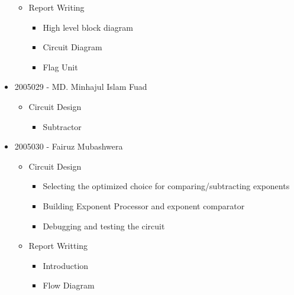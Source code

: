 \documentclass[18pt]{article}
\begin{document}
\begin{itemize}
\begin{itemize}
        \item Report Writing
        \begin{itemize}
            \item High level block diagram
			\item Circuit Diagram
            \item Flag Unit
        \end{itemize}
    \end{itemize}
    \item 2005029 - MD. Minhajul Islam Fuad
    \begin{itemize}
        \item Circuit Design
        \begin{itemize}
            \item Subtractor
        \end{itemize}
    \end{itemize}
    \item 2005030 - Fairuz Mubashwera
    \begin{itemize}
        \item Circuit Design
        \begin{itemize}
        \item Selecting the optimized choice for comparing/subtracting exponents
\item Building Exponent Processor and exponent comparator
\item Debugging and testing the circuit
        \end{itemize}
    \item Report Writting
        \begin{itemize}
        \item Introduction
        \item Flow Diagram
        \end{itemize}
    \end{itemize}
\end{itemize}
\end{document}

